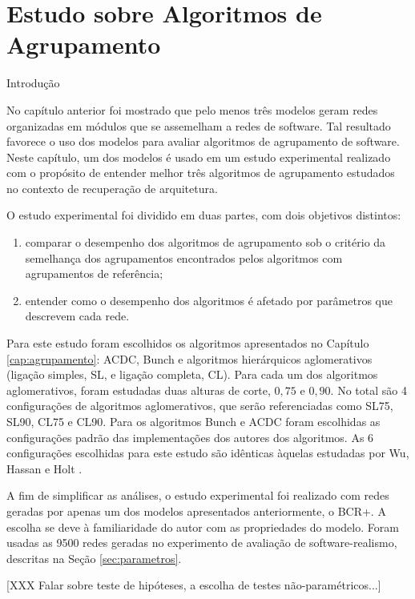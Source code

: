 
\chapter{Estudo sobre Algoritmos de Agrupamento} \label{cap:estudo}

\begin{section}{Introdução}

No capítulo anterior foi mostrado que pelo menos três modelos geram redes organizadas em módulos que se assemelham a redes de software. Tal resultado favorece o uso dos modelos para avaliar algoritmos de agrupamento de software. Neste capítulo, um dos modelos é usado em um estudo experimental realizado com o propósito de entender melhor três algoritmos de agrupamento estudados no contexto de recuperação de arquitetura.

O estudo experimental foi dividido em duas partes, com dois objetivos distintos:
\begin{enumerate}
	\item comparar o desempenho dos algoritmos de agrupamento sob o critério da semelhança dos agrupamentos encontrados pelos algoritmos com agrupamentos de referência;
	\item entender como o desempenho dos algoritmos é afetado por parâmetros que descrevem cada rede.
\end{enumerate}

Para este estudo foram escolhidos os algoritmos apresentados no Capítulo \ref{cap:agrupamento}: ACDC, Bunch e algoritmos hierárquicos aglomerativos (ligação simples, SL, e ligação completa, CL). Para cada um dos algoritmos aglomerativos, foram estudadas duas alturas de corte, $0,75$ e $0,90$. No total são 4 configurações de algoritmos aglomerativos, que serão referenciadas como SL75, SL90, CL75 e CL90. Para os algoritmos Bunch e ACDC foram escolhidas as configurações padrão das implementações dos autores dos algoritmos. As 6 configurações escolhidas para este estudo são idênticas àquelas estudadas por Wu, Hassan e Holt \cite{Wu2005}.

A fim de simplificar as análises, o estudo experimental foi realizado com redes geradas por apenas um dos modelos apresentados anteriormente, o BCR+. A escolha se deve à familiaridade do autor com as propriedades do modelo. Foram usadas as 9500 redes geradas no experimento de avaliação de software-realismo, descritas na Seção \ref{sec:parametros}.

[XXX Falar sobre teste de hipóteses, a escolha de testes não-paramétricos...]

	
\end{section}

